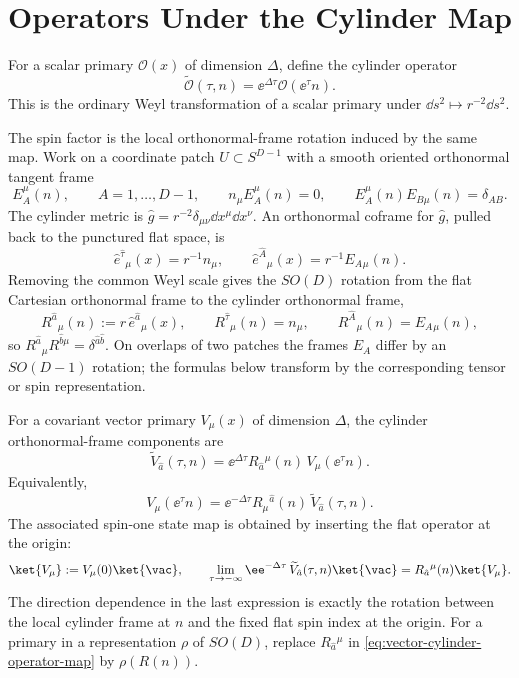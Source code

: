\section{Operators Under the Cylinder Map}

For a scalar primary \(\mathcal O(x)\) of dimension \(\Delta\), define the
cylinder operator
\begin{equation}
  \widetilde{\mathcal O}(\tau,n)
  =
  \ee^{\Delta\tau}\mathcal O(\ee^\tau n).
  \label{eq:scalar-cylinder-operator-map}
\end{equation}
This is the ordinary Weyl transformation of a scalar primary under
\(\dd s^2\mapsto r^{-2}\dd s^2\).

The spin factor is the local orthonormal-frame rotation induced by the same
map.  Work on a coordinate patch \(U\subset S^{D-1}\) with a smooth oriented
orthonormal tangent frame
\[
  E_A^\mu(n),
  \qquad
  A=1,\ldots,D-1,
  \qquad
  n_\mu E_A^\mu(n)=0,
  \qquad
  E_A^\mu(n)E_{B\mu}(n)=\delta_{AB}.
\]
The cylinder metric is \(\widehat g=r^{-2}\delta_{\mu\nu}\dd x^\mu\dd x^\nu\).
An orthonormal coframe for \(\widehat g\), pulled back to the punctured flat
space, is
\begin{equation}
  \widehat e^{\hat\tau}{}_\mu(x)=r^{-1}n_\mu,
  \qquad
  \widehat e^{\hat A}{}_\mu(x)=r^{-1}E_A{}_\mu(n).
  \label{eq:cylinder-local-orthonormal-coframe}
\end{equation}
Removing the common Weyl scale gives the \(SO(D)\) rotation from the flat
Cartesian orthonormal frame to the cylinder orthonormal frame,
\begin{equation}
  R^{\hat a}{}_\mu(n)
  :=
  r\,\widehat e^{\hat a}{}_\mu(x),
  \qquad
  R^{\hat\tau}{}_\mu(n)=n_\mu,
  \qquad
  R^{\hat A}{}_\mu(n)=E_A{}_\mu(n),
  \label{eq:cylinder-frame-rotation}
\end{equation}
so \(R^{\hat a}{}_\mu R^{\hat b\mu}=\delta^{\hat a\hat b}\).  On overlaps of
two patches the frames \(E_A\) differ by an \(SO(D-1)\) rotation; the formulas
below transform by the corresponding tensor or spin representation.

For a covariant vector primary \(V_\mu(x)\) of dimension \(\Delta\), the
cylinder orthonormal-frame components are
\begin{equation}
  \widetilde V_{\hat a}(\tau,n)
  =
  \ee^{\Delta\tau}
  R_{\hat a}{}^\mu(n)\,
  V_\mu(\ee^\tau n).
  \label{eq:vector-cylinder-operator-map}
\end{equation}
Equivalently,
\[
  V_\mu(\ee^\tau n)
  =
  \ee^{-\Delta\tau}
  R_\mu{}^{\hat a}(n)\,
  \widetilde V_{\hat a}(\tau,n).
\]
The associated spin-one state map is obtained by inserting the flat operator at
the origin:
\begin{equation}
  \ket{V_\mu}:=V_\mu(0)\ket{\vac},
  \qquad
  \lim_{\tau\to-\infty}
  \ee^{-\Delta\tau}\,
  \widetilde V_{\hat a}(\tau,n)\ket{\vac}
  =
  R_{\hat a}{}^\mu(n)\ket{V_\mu}.
  \label{eq:vector-primary-state-map}
\end{equation}
The direction dependence in the last expression is exactly the rotation between
the local cylinder frame at \(n\) and the fixed flat spin index at the origin.
For a primary in a representation \(\rho\) of \(SO(D)\), replace
\(R_{\hat a}{}^\mu\) in \eqref{eq:vector-cylinder-operator-map} by
\(\rho(R(n))\).

